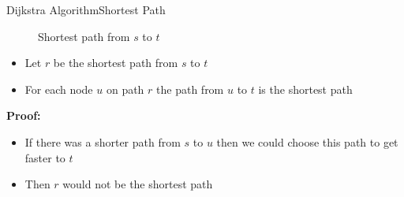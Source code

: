 \begin{frame}{Dijkstra Algorithm}{Shortest Path}
  \vspace{-1.5em}
  \begin{figure}
    \begin{adjustbox}{width=0.75\linewidth}
      
    \end{adjustbox}
    \label{fig:dijkstra:shortest_path_introduction}
    \caption{Shortest path from {\color{Mittel-Blau}$s$} to
    {\color{Mittel-Blau}$t$}}
  \end{figure}
  \vspace{-1.5em}
  \begin{itemize}
    \item
      Let {\color{Mittel-Gruen}$r$} be the shortest path from
      {\color{Mittel-Blau}$s$} to {\color{Mittel-Blau}$t$}
    \item
      For each node {\color{Mittel-Blau}$u$} on path {\color{Mittel-Gruen}$r$}
      the path from {\color{Mittel-Blau}$u$} to {\color{Mittel-Blau}$t$} is
      the shortest path
  \end{itemize}
  \textbf{Proof:}
  \begin{itemize}
    \item
      If there was a shorter path from {\color{Mittel-Blau}$s$} to
      {\color{Mittel-Blau}$u$} then we could choose this path to get faster to
      {\color{Mittel-Blau}$t$}
    \item
      Then {\color{Mittel-Gruen}$r$} would not be the shortest path
  \end{itemize}
\end{frame}


